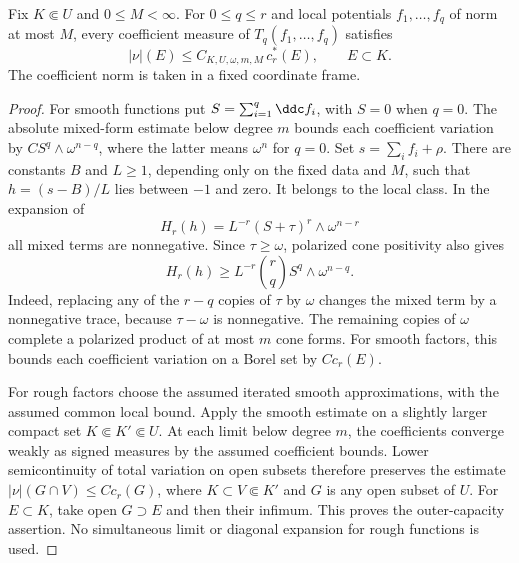 \begin{lemma}\label{draft619:capacity-domination}
Fix $K\Subset U$ and $0\leq M<\infty$. For $0\leq q\leq r$ and local
potentials $f_1,\ldots,f_q$ of norm at most $M$, every coefficient
measure of $T_q(f_1,\ldots,f_q)$ satisfies
\[
 |\nu|(E)\leq C_{K,U,\omega,m,M}\,c_r^*(E),\qquad E\subset K.
\]
The coefficient norm is taken in a fixed coordinate frame.
\end{lemma}
\begin{proof}
For smooth functions put $S=\sum_{i=1}^q\ddc f_i$, with $S=0$ when
$q=0$. The absolute mixed-form estimate below degree $m$ bounds each
coefficient variation by
$C S^q\wedge\omega^{n-q}$, where the latter means $\omega^n$ for
$q=0$. Set $s=\sum_i f_i+\rho$. There are constants $B$ and $L\geq1$,
depending only on the fixed data and $M$, such that
$h=(s-B)/L$ lies between $-1$ and zero. It belongs to the local class.
In the expansion of
\[
 H_r(h)=L^{-r}(S+\tau)^r\wedge\omega^{n-r}
\]
all mixed terms are nonnegative. Since $\tau\geq\omega$, polarized
cone positivity also gives
\[
 H_r(h)\geq L^{-r}\binom rq
                  S^q\wedge\omega^{n-q}.
\]
Indeed, replacing any of the $r-q$ copies of $\tau$ by $\omega$
changes the mixed term by a nonnegative trace, because
$\tau-\omega$ is nonnegative. The remaining copies of $\omega$
complete a polarized product of at most $m$ cone forms.
For smooth factors, this bounds each coefficient variation on a Borel
set by $C c_r(E)$.

For rough factors choose the assumed iterated smooth approximations,
with the assumed common local bound. Apply the smooth estimate on a
slightly larger compact set $K\Subset K'\Subset U$. At each limit below
degree $m$, the coefficients converge weakly as signed measures by
the assumed coefficient bounds. Lower semicontinuity of total
variation on open subsets therefore preserves the estimate
$|\nu|(G\cap V)\leq Cc_r(G)$, where $K\subset V\Subset K'$
and $G$ is any open subset of $U$. For $E\subset K$, take open
$G\supset E$ and then their infimum. This proves the outer-capacity
assertion. No simultaneous limit or diagonal expansion for rough
functions is used.
\end{proof}

